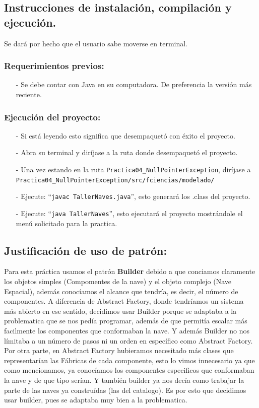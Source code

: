 \documentclass{article}
\newcommand{\code}[1]{\textcolor{white!25!black}{\texttt{#1}}}
\begin{document}
\subsection*{Instrucciones de instalación, compilación y ejecución.}
Se dará por hecho que el usuario sabe moverse en terminal.\\

\subsubsection*{Requerimientos previos:}
\begin{itemize}
\item[-] Se debe contar con Java en su computadora. De preferencia la versión más reciente.
\end{itemize}

\subsubsection*{Ejecución del proyecto:}
\begin{itemize}
\item[-] Si está leyendo esto significa que desempaquetó con éxito el proyecto.
\item[-] Abra su terminal y diríjase a la ruta donde desempaquetó el proyecto.
\item[-] Una vez estando en la ruta \code{Practica04\_NullPointerException}, diríjase a
  \code{Practica04\_NullPointerException/src/fciencias/modelado/}
\item[-] Ejecute: “\code{javac TallerNaves.java}”, esto generará los .class del proyecto.
\item[-] Ejecute: “\code{java TallerNaves}”, esto ejecutará el proyecto mostrándole el menú solicitado para la practica.
\end{itemize}

\newpage
\subsection*{Justificación de uso de patrón:}
Para esta práctica usamos el patrón \textbf{Builder} debido a que conciamos claramente los objetos simples (Compomentes de la nave) y el objeto complejo (Nave Espacial), además conocíamos el alcance que tendría, es decir, el número de componentes. 
A diferencia de Abstract Factory, donde tendríamos un sistema más abierto en ese sentido, decidimos usar Builder porque se adaptaba a la problematica que se nos pedía programar, además de que permitía escalar más facilmente los componentes que conformaban la nave.
Y además Builder no nos límitaba a un número de pasos ni un orden en específico como Abstract Factory.
Por otra parte, en Abstract Factory hubieramos necesitado más clases que representarían las Fábricas de cada componente, esto lo vimos innecesario ya que como mencionamos, ya conocíamos los componentes especificos que conformaban la nave y de que tipo serían.
Y también builder ya nos decía como trabajar la parte de las naves ya construídas (las del catalogo). 
Es por esto que decidimos usar builder, pues se adaptaba muy bien a la problematica.
\end{document}
